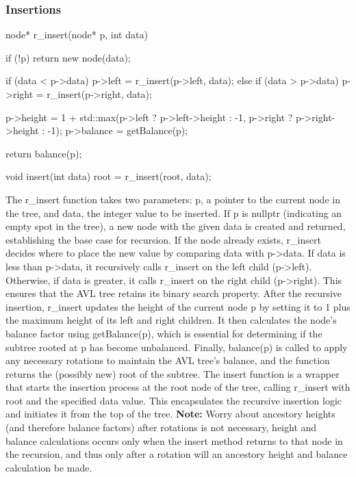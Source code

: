 \documentclass{report}
\begin{document}
\subsubsection{Insertions}
\bigbreak \noindent 
\begin{cppcode}
    node* r_insert(node* p, int data) {
        if (!p) return new node(data);

        if (data < p->data) {
            p->left = r_insert(p->left, data);
        } else if (data > p->data) {
            p->right = r_insert(p->right, data);
        }

        p->height = 1 + std::max(p->left ? p->left->height : -1, p->right ? p->right->height : -1);
        p->balance = getBalance(p);

        return balance(p);
    }

    void insert(int data) {
        root = r_insert(root, data);
    }
\end{cppcode}
\bigbreak \noindent 
The r\_insert function takes two parameters: p, a pointer to the current node in the tree, and data, the integer value to be inserted. If p is nullptr (indicating an empty spot in the tree), a new node with the given data is created and returned, establishing the base case for recursion.
\bigbreak \noindent 
If the node already exists, r\_insert decides where to place the new value by comparing data with p->data. If data is less than p->data, it recursively calls r\_insert on the left child (p->left). Otherwise, if data is greater, it calls r\_insert on the right child (p->right). This ensures that the AVL tree retains its binary search property.
\bigbreak \noindent 
After the recursive insertion, r\_insert updates the height of the current node p by setting it to 1 plus the maximum height of its left and right children. It then calculates the node’s balance factor using getBalance(p), which is essential for determining if the subtree rooted at p has become unbalanced. Finally, balance(p) is called to apply any necessary rotations to maintain the AVL tree's balance, and the function returns the (possibly new) root of the subtree.
\bigbreak \noindent 
The insert function is a wrapper that starts the insertion process at the root node of the tree, calling r\_insert with root and the specified data value. This encapsulates the recursive insertion logic and initiates it from the top of the tree.
\bigbreak \noindent 
\textbf{Note:} Worry about ancestory heights (and therefore balance factors) after rotations is not necessary, height and balance calculations occurs only when the insert method returns to that node in the recursion, and thus only after a rotation will an ancestory height and balance calculation be made.
\end{document}
